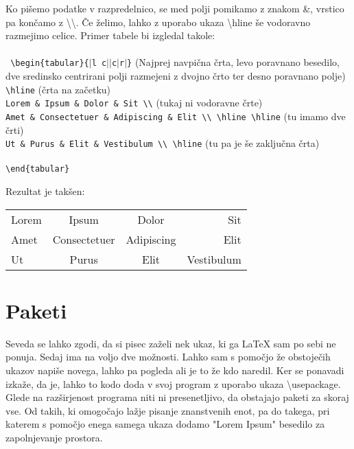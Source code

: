 \documentclass[a4paper]{book}
\newcommand\tbs{\textbackslash{}}
\begin{document}
Ko pišemo podatke v razpredelnico, se med polji pomikamo z znakom \&{}, vrstico pa končamo z \tbs\tbs. Če želimo, lahko z uporabo ukaza \tbs{}hline še vodoravno razmejimo celice.
Primer tabele bi izgledal takole:\\ \\
\texttt{
\tbs{}begin\{tabular\}\{$|$l c$||$c$|$r$|$\}} (Najprej navpična črta, levo poravnano besedilo, dve sredinsko centrirani polji razmejeni z dvojno črto ter desno poravnano polje)\\
\texttt{\tbs{}hline} \hfill (črta na začetku)\\
\texttt{Lorem \& Ipsum \& Dolor \& Sit \tbs{}\tbs{}} \hfill (tukaj ni vodoravne črte)\\
\texttt{Amet \& Consectetuer \& Adipiscing \& Elit \tbs{}\tbs{} \tbs{}hline \tbs{}hline} \hfill (tu imamo dve črti)\\
\texttt{Ut \& Purus \& Elit \& Vestibulum \tbs{}\tbs{} \tbs{}hline} \hfill (tu pa je še zaključna črta)\\\\
\texttt{\tbs{}end\{tabular\}\\}

Rezultat je takšen:\\

\begin{tabular}{|l c||c|r|}
\hline
Lorem & Ipsum & Dolor & Sit \\
Amet & Consectetuer & Adipiscing & Elit \\ \hline \hline
Ut & Purus & Elit & Vestibulum \\ \hline

\end{tabular}



\section{Paketi}
Seveda se lahko zgodi, da si pisec zaželi nek ukaz, ki ga \LaTeX{} sam po sebi ne ponuja. Sedaj ima na voljo dve možnosti. Lahko sam s pomočjo že obstoječih ukazov napiše novega, lahko pa pogleda ali je to že kdo naredil. Ker se ponavadi izkaže, da je, lahko to kodo doda v svoj program z uporabo ukaza \tbs{}usepackage. Glede na razširjenost programa niti ni presenetljivo, da obstajajo paketi za skoraj vse. Od takih, ki omogočajo lažje pisanje znanstvenih enot, pa do takega, pri katerem s pomočjo enega samega ukaza dodamo "Lorem Ipsum" besedilo za zapolnjevanje prostora.
\end{document}
